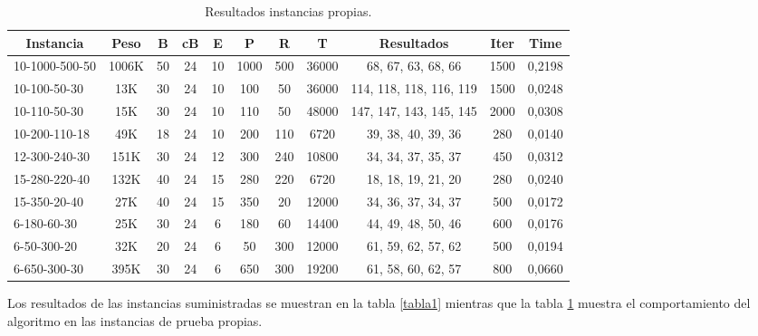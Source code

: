 \documentclass[letter, 10pt]{article}
\begin{document}
    \begin{table}[h!]
        \centering
        \caption{Resultados instancias propias.}
        \begin{tabular}{|l|c|c|c|c|c|c|c|c|c|c|}
            \hline
            \multicolumn{1}{|c|}{{\bf Instancia}} & {\bf Peso} & {\bf B} &
                    {\bf cB} & {\bf E} & {\bf P} & {\bf R} & {\bf T} & 
                    {\bf Resultados}   & {\bf Iter} & {\bf Time} \\ \hline
            10-1000-500-50 & 1006K & 50 & 24 & 10 & 1000 & 500 & 36000 &
                    68, 67, 63, 68, 66      & 1500 & 0,2198 \\ \hline
            10-100-50-30   & 13K   & 30 & 24 & 10 & 100  & 50  & 36000 &
                    114, 118, 118, 116, 119 & 1500 & 0,0248 \\ \hline
            10-110-50-30   & 15K   & 30 & 24 & 10 & 110  & 50  & 48000 &
                    147, 147, 143, 145, 145 & 2000 & 0,0308 \\ \hline
            10-200-110-18  & 49K   & 18 & 24 & 10 & 200  & 110 & 6720  &
                    39, 38, 40, 39, 36      & 280  & 0,0140 \\ \hline
            12-300-240-30  & 151K  & 30 & 24 & 12 & 300  & 240 & 10800 &
                    34, 34, 37, 35, 37      & 450  & 0,0312 \\ \hline
            15-280-220-40  & 132K  & 40 & 24 & 15 & 280  & 220 & 6720  &
                    18, 18, 19, 21, 20      & 280  & 0,0240 \\ \hline
            15-350-20-40   & 27K   & 40 & 24 & 15 & 350  & 20  & 12000 &
                    34, 36, 37, 34, 37      & 500  & 0,0172 \\ \hline
            6-180-60-30    & 25K   & 30 & 24 & 6  & 180  & 60  & 14400 &
                    44, 49, 48, 50, 46      & 600  & 0,0176 \\ \hline
            6-50-300-20    & 32K   & 20 & 24 & 6  & 50   & 300 & 12000 &
                    61, 59, 62, 57, 62      & 500  & 0,0194 \\ \hline
            6-650-300-30   & 395K  & 30 & 24 & 6  & 650  & 300 & 19200 &
                    61, 58, 60, 62, 57      & 800  & 0,0660 \\ \hline
        \end{tabular}
        \label{tabla2}
    \end{table}

    Los resultados de las instancias suministradas se muestran en la tabla
    \ref{tabla1} mientras que la tabla \ref{tabla2} muestra el comportamiento
    del algoritmo en las instancias de prueba propias.
\end{document}
